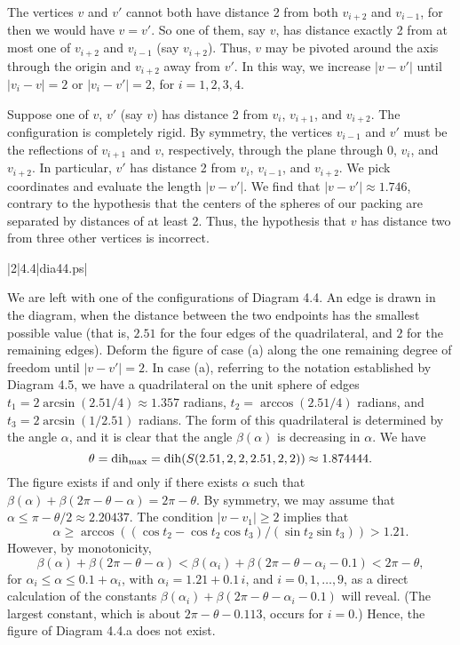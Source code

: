 The vertices $v$ and $v'$ cannot both have distance 2 from both
$v_{i+2}$ and $v_{i-1}$, for then we would have $v=v'$.  So one of them,
say $v$, has distance exactly 2 from at most one of $v_{i+2}$ and $v_{i-1}$
(say $v_{i+2}$).  Thus, $v$ may be pivoted around the axis through the
origin and $v_{i+2}$
away from $v'$.  In this way, we increase $|v-v'|$ until
$|v_i-v|=2$ or $|v_i-v'|=2$, for $i=1,2,3,4$.

Suppose one of $v$, $v'$ (say $v$) has distance 2 
from $v_i$, $v_{i+1}$, and $v_{i+2}$.
The configuration is completely rigid. By symmetry, the vertices
$v_{i-1}$ and $v'$ must be the reflections of $v_{i+1}$
and $v$, respectively, through the plane through $0$, $v_i$,
and $v_{i+2}$.  In particular, $v'$ has distance 2 from
$v_i$, $v_{i-1}$, and $v_{i+2}$.
We pick coordinates and evaluate the
length $|v-v'|$.
We find that $|v-v'|\approx 1.746$, contrary to the hypothesis
that the centers of the spheres of our packing are separated by distances
of at least 2.
Thus, the
hypothesis that $v$ has distance two from three other vertices
is incorrect.

\gram|2|4.4|dia44.ps|

We are left with one of the configurations of Diagram 4.4.  
An edge is drawn in the diagram,
when the distance between the two endpoints has the smallest possible value
(that is, $2.51$ for the four edges of the quadrilateral,
and $2$ for the remaining edges).  
Deform the figure of case (a) along the one remaining
degree of freedom until
$|v-v'|=2$.  In case (a),
referring to the notation established by Diagram 4.5,
we have a quadrilateral on the unit sphere
of edges $t_1 =  2\arcsin(2.51/4)\approx 1.357$ radians,
$t_2=\arccos(2.51/4)$ radians, and $t_3=2\arcsin(1/2.51)$ radians.
The form of this quadrilateral
is determined by the angle $\alpha$, and it is clear that
the angle $\beta(\alpha)$
is decreasing in $\alpha$.
 We have $$\theta=\operatorname{dih}_{\max} =
\operatorname{dih}(S(2.51,2,2,2.51,2,2))\approx 1.874444.$$
The figure exists if and only if there exists $\alpha$ such that
$\beta(\alpha) + \beta(2\pi-\theta-\alpha) = 2\pi-\theta$.
By symmetry, we may assume that $\alpha\le\pi-\theta/2\approx 2.20437$.  
The condition $|v-v_1|\ge 2$ implies that
$$\alpha\ge \arccos\left (( \cos t_2 - \cos t_2 \cos t_3)/(\sin t_2 \sin t_3) \right)
        > 1.21.$$
However, by monotonicity,
$$\beta(\alpha) +\beta(2\pi-\theta-\alpha) < \beta(\alpha_{i}) +
        \beta(2\pi-\theta-\alpha_{i}-0.1)
        < 2\pi-\theta,$$
for $\alpha_{i}\le \alpha\le 0.1+\alpha_{i}$,
with $\alpha_i = 1.21+0.1\,i$, and $i=0,1,\ldots,9$, as a direct
calculation of the constants $\beta(\alpha_i) +\beta(2\pi-\theta-\alpha_i-0.1)$
will reveal.  (The largest constant,
which is about $2\pi-\theta-0.113$,  occurs for $i=0$.)
Hence, the figure of Diagram 4.4.a does not exist.

